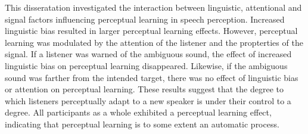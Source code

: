 This disseratation investigated the interaction between linguistic, attentional and signal factors influencing perceptual learning in speech perception.
Increased linguistic bias resulted in larger perceptual learning effects.
However, perceptual learning was modulated by the attention of the listener and the propterties of the signal.
If a listener was warned of the ambiguous sound, the effect of increased linguistic bias on perceptual learning disappeared.
Likewise, if the ambiguous sound was farther from the intended target, there was no effect of linguistic bias or attention on perceptual learning.
These results suggest that the degree to which listeners perceptually adapt to a new speaker is under their control to a degree.
All participants as a whole exhibited a perceptual learning effect, indicating that perceptual learning is to some extent an automatic process.


